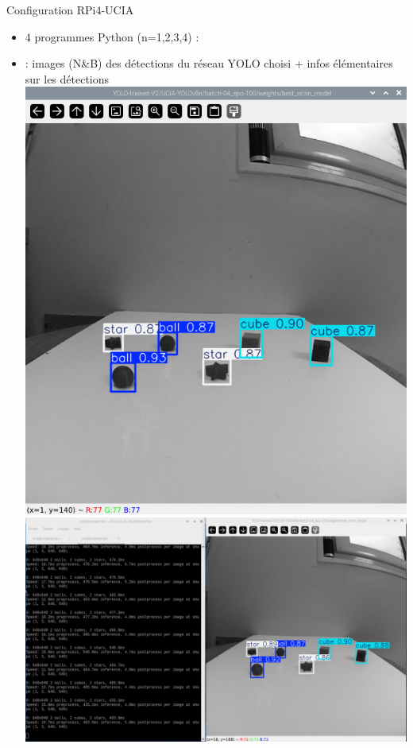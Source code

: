 \documentclass[11pt,serif,mathserif,compress,hyperref={colorlinks}]{beamer}
\begin{document}
\begin{frame}{Configuration RPi4-UCIA}
  
  \begin{tcolorbox}[title={Programmes Python d'exploitation des réseaux YOLO}, add to width=.7cm, height=68mm]
    {\small
      \begin{itemize}
      \item<1-> 4 programmes Python  (n=1,2,3,4) :
      \item<2->  : images (N\&B) des détections du réseau YOLO choisi 
        + infos élémentaires sur les détections\\
         {\vspace*{-3.5cm}\includegraphics[width=.7\textwidth]{images/detect_camera-1_a.png}}
         {\vspace*{-3.5cm}\hspace*{-15mm}\includegraphics[width=1.2\textwidth]{images/detect_camera-1_b.png}}

\end{itemize}}
\end{tcolorbox}
\end{frame}
\end{document}
